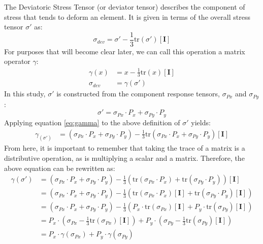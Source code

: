 The Deviatoric Stress Tensor (or deviator tensor) describes the component of stress that tends to deform an element. It is given in terms of the overall stress tensor $\sigma'$ as: 
   \begin{equation}
      \sigma_{dev} = \sigma' - \frac{1}{3} \mathrm{tr}(\sigma') \left[ \mathbf{I} \right]
   \end{equation}
For purposes that will become clear later, we can call this operation a matrix operator $\gamma$:
   \begin{align}
      \gamma(x) &= x - \frac{1}{3} \mathrm{tr}(x) \left[ \mathbf{I} \right]\label{eq:gamma}\\
      \sigma_{dev} &= \gamma(\sigma') \nonumber
   \end{align}
In this study, $\sigma'$ is constructed from the component response tensors, $\sigma_{Px}$ and $\sigma_{Py}$:
   \begin{equation*}
      \sigma' = \sigma_{Px} \cdot P_x + \sigma_{Py} \cdot P_y
   \end{equation*}
Applying equation \ref{eq:gamma} to the above definition of $\sigma'$ yields:
   \begin{align}
	   \gamma_(\sigma') &= \left(\sigma_{Px} \cdot P_x + \sigma_{Py} \cdot P_y\right) - 
                       \frac{1}{3} \mathrm{tr} \left(\sigma_{Px} \cdot P_x + \sigma_{Py}
                       \cdot P_y\right) \left[ \mathbf{I} \right] 
   \end{align}
From here, it is important to remember that taking the trace of a matrix is a distributive operation, as is multiplying a scalar and a matrix. Therefore, the above equation can be rewritten as: 
   \begin{align}
	   \gamma(\sigma') &= \left(\sigma_{Px} \cdot P_x + \sigma_{Py} \cdot P_y\right) - 
                       \frac{1}{3} \left(\mathrm{tr} \left(\sigma_{Px} \cdot P_x\right) +
                       \mathrm{tr} \left( \sigma_{Py} \cdot P_y\right)\right) 
                       \left[ \mathbf{I} \right]\nonumber \\
                      &= \left(\sigma_{Px} \cdot P_x + \sigma_{Py} \cdot P_y\right) - 
		       \frac{1}{3} \left(\mathrm{tr} \left(\sigma_{Px} \cdot P_x\right)
		       \left[ \mathbf{I} \right] +
                       \mathrm{tr} \left( \sigma_{Py} \cdot P_y\right) 
                       \left[ \mathbf{I} \right]\right)\nonumber\\
		      &= \left(\sigma_{Px} \cdot P_x + \sigma_{Py} \cdot P_y\right) - 
		       \frac{1}{3} \left(P_x \cdot \mathrm{tr} \left(\sigma_{Px}\right)
		       \left[ \mathbf{I} \right] +
                       P_y \cdot \mathrm{tr} \left( \sigma_{Py} \right) 
                       \left[ \mathbf{I} \right]\right)\nonumber\\
		      &= P_x \cdot \left( \sigma_{Px} - \frac{1}{3} \mathrm{tr}(\sigma_{Px})
			 \left[ \mathbf{I} \right] \right) + P_y \cdot \left( \sigma_{Py} -
			 \frac{1}{3} \mathrm{tr}(\sigma_{Py})
			 \left[ \mathbf{I} \right] \right)\nonumber\\
		      &= P_x \cdot \gamma(\sigma_{Px}) + P_y \cdot \gamma(\sigma_{Py})
   \end{align}
